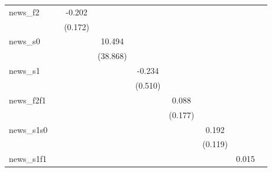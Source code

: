 {\begin{tabular}{l*{8}{c}}
\addlinespace
news\_f2     &                     &      -0.202         &                     &                     &                     &                     &                     &                     \\
            &                     &     (0.172)         &                     &                     &                     &                     &                     &                     \\
\addlinespace
news\_s0     &                     &                     &      10.494         &                     &                     &                     &                     &                     \\
            &                     &                     &    (38.868)         &                     &                     &                     &                     &                     \\
\addlinespace
news\_s1     &                     &                     &                     &      -0.234         &                     &                     &                     &                     \\
            &                     &                     &                     &     (0.510)         &                     &                     &                     &                     \\
\addlinespace
news\_f2f1   &                     &                     &                     &                     &       0.088         &                     &                     &                     \\
            &                     &                     &                     &                     &     (0.177)         &                     &                     &                     \\
\addlinespace
news\_s1s0   &                     &                     &                     &                     &                     &       0.192         &                     &                     \\
            &                     &                     &                     &                     &                     &     (0.119)         &                     &                     \\
\addlinespace
news\_s1f1   &                     &                     &                     &                     &                     &                     &       0.015         &                     \\

\end{tabular}}
